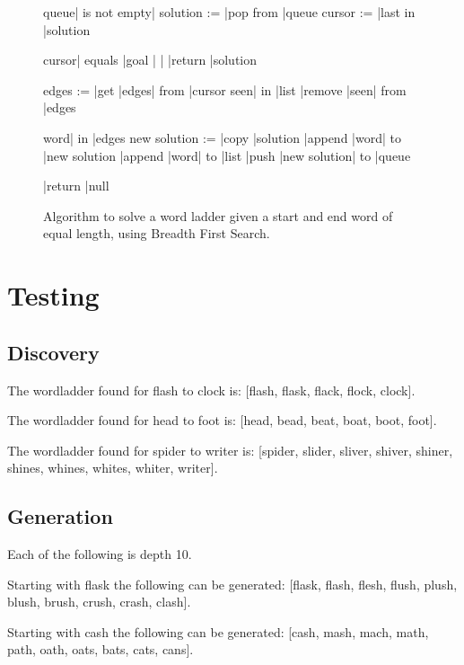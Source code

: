 \documentclass[11pt]{article} %
\begin{document}
\begin{figure}[h!!]
\caption{Algorithm to solve a word ladder given a start and end word of equal length, using Breadth First Search.}
\begin{program}
\BEGIN
\WHILE queue| is not empty|\DO
	solution := |pop from |queue 
	cursor := |last in |solution

	\IF cursor| equals |goal | |\THEN
		|return |solution 
	\FI
	
	edges := |get |edges| from |cursor
	\FOR seen| in |list \DO
		|remove |seen| from |edges 
	\OD

	\FOR word| in |edges \DO
		new solution := |copy |solution 
		|append |word| to |new solution
		|append |word| to |list 
		|push |new solution| to |queue 
	\OD

	|return |null 
\OD
\END
\end{program}
\label{fig:DiscoverAlgorithm}
\end{figure}


\section{Testing}
\subsection{Discovery}
The wordladder found for flash to clock is: [flash, flask, flack, flock, clock].

The wordladder found for head to foot is: [head, bead, beat, boat, boot, foot].

The wordladder found for spider to writer is: [spider, slider, sliver, shiver, shiner, shines, whines, whites, whiter, writer].

\subsection{Generation}
Each of the following is depth 10.

Starting with flask the following can be generated: [flask, flash, flesh, flush, plush, blush, brush, crush, crash, clash].

Starting with cash the following can be generated: [cash, mash, mach, math, path, oath, oats, bats, cats, cans].
\end{document}
